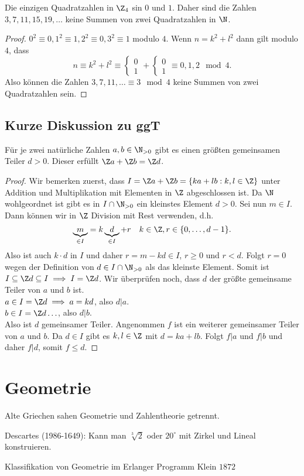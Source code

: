 \begin{lemma}
	Die einzigen Quadratzahlen in $\Z_4$ sin $0$ und $1$.
	Daher sind die Zahlen $3,7,11,15,19,\ldots$ keine Summen von zwei Quadratzahlen in $\N$.
\end{lemma}

\begin{proof}
	$0^2 \equiv 0, 1^2 \equiv 1, 2^2 \equiv 0, 3^2 \equiv 1$ modulo $4$.
	Wenn $n = k^2 + l^2$ dann gilt modulo $4$, dass
	\[
	n \equiv k^2 + l^2 \equiv \begin{cases}
		0\\ 1
	\end{cases}+\begin{cases}
		0\\ 1
	\end{cases} \equiv 0,1,2 \mod 4
	.\] 
	Also können die Zahlen $3,7,11,\ldots \equiv 3 \mod 4$ keine Summen von zwei Quadratzahlen sein.
\end{proof}

\subsection{Kurze Diskussion zu ggT}
\begin{proposition}
	Für je zwei natürliche Zahlen $a,b \in \N_{>0}$ gibt es einen größten gemeinsamen Teiler $d > 0$.
	Dieser erfüllt $\Z a + \Z b = \Z d$.
\end{proposition}

\begin{proof}
	Wir bemerken zuerst, dass $I = \Z a + \Z b = \{k a + l b: k,l \in \Z\} $ unter Addition und Multiplikation mit Elementen in $\Z$ abgeschlossen ist.
	Da $\N$ wohlgeordnet ist gibt es in $I \cap \N_{> 0}$ ein kleinstes Element $d > 0$.
	Sei nun $m \in I$. Dann können wir in $\Z$ Division mit Rest verwenden, d.h.
	\[
		\underbrace{m}_{\in I} = k\underbrace{d}_{\in I} + r \quad k \in \Z, r \in \{0,\ldots,d-1\} 
	.\] 
	Also ist auch $k \cdot d$ in $I$ und daher $r = m - kd \in I$, $r \geq 0$ und $r < d$. Folgt $r = 0$ wegen der Definition von $d \in I \cap \N_{>0}$ als das kleinste Element.
	Somit ist $I \subseteq \Z d \subseteq I \implies I = \Z d$.
	Wir überprüfen noch, dass $d$ der größte gemeinsame Teiler von $a$ und $b$ ist.\\
	$a \in I = \Z d \implies a = k d$, also $d \vert a$. \\
	$b \in I = \Z d \ldots$, also $d \vert b$.\\
	Also ist $d$ gemeinsamer Teiler. Angenommen $f$ ist ein weiterer gemeinsamer Teiler von $a$ und $b$.
	Da $d \in I$ gibt es $k,l \in \Z$ mit $d = k a + l b$. Folgt $f \vert a$ und $f \vert b$ und daher $f \vert d$, somit $f \leq d$.

\end{proof}

\section{Geometrie}
Alte Griechen sahen Geometrie und Zahlentheorie getrennt.

Descartes (1986-1649): Kann man $\sqrt[3]{2}$ oder $20^{\circ}$ mit Zirkel und Lineal konstruieren.

Klassifikation von Geometrie im Erlanger Programm Klein $1872$














